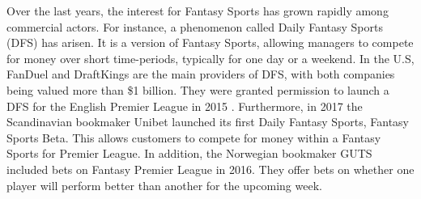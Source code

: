 \newpar

Over the last years, the interest for Fantasy Sports has grown rapidly among commercial actors. For instance, a phenomenon called Daily Fantasy Sports (DFS) has arisen. It is a version of Fantasy Sports, allowing managers to compete for money over short time-periods, typically for one day or a weekend. In the U.S, FanDuel and DraftKings are the main providers of DFS, with both companies being valued more than \$1 billion. They were granted permission to launch a DFS for the English Premier League in 2015 \citep{Purdum}. Furthermore, in 2017 the Scandinavian bookmaker Unibet launched its first Daily Fantasy Sports, Fantasy Sports Beta. This allows customers to compete for money within a Fantasy Sports for Premier League. In addition, the Norwegian bookmaker GUTS included bets on Fantasy Premier League in 2016. They offer bets on whether one player will perform better than another for the upcoming week. 
\newpar

\begin{comment}
Although Daily Fantasy Sports are primarily available for American leagues, FanDuel and DraftKings were granted permission to launch a DFS for the English Premier League in 2015 \citep{Purdum}. However, DFS is yet to break through in Europe. With the great interest of the English Premier League, and the amount of active FPL managers, a question has arisen of why this is the case. The answer may lie in the difference in gambling rules in the US and in Europe. While sports gambling is illegal in most of the states in the US, sports gambling has been a tradition in Europe for several years. Hence, European gamblers might not consider Daily Fantasy Sports as a substitute for regular sports gambling.

\newpar

For the past years, there has been a lack of European bookmakers providing gambling for Fantasy Sports. In 2017 however, the Scandinavian bookmaker Unibet launched its first Daily Fantasy Sports, Fantasy Sports Beta. This allows customers to compete for money within a Fantasy Sports for Premier League. In addition, the Norwegian bookmaker GUTS included bets on Fantasy Premier League in 2016. For instance, one may bet on whether one player will perform better than another for the upcoming week. Additionally, one can bet on which of the top rated players will perform best for the upcoming gameweek. As a result of Fantasy Premier League becoming more popular over years and European bookmakers providing odds for the game, it seems like Fantasy Sports can experience a growth in Europe as well. 
\end{comment}


